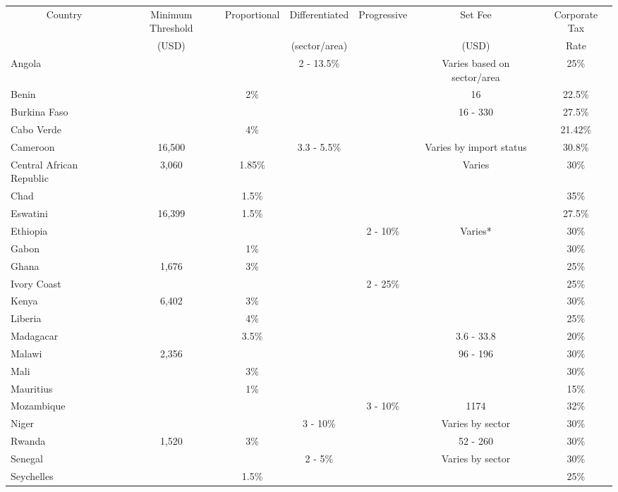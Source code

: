 \begin{tabular}{lcccccc}
\toprule
\multicolumn{1}{c}{Country} & \multicolumn{1}{c}{Minimum Threshold} & \multicolumn{1}{c}{Proportional} & \multicolumn{1}{c}{Differentiated} & \multicolumn{1}{c}{Progressive} & \multicolumn{1}{c}{Set Fee} & \multicolumn{1}{c}{Corporate Tax} \\
\multicolumn{1}{c}{} & \multicolumn{1}{c}{(USD)} & \multicolumn{1}{c}{} & \multicolumn{1}{c}{(sector/area)} & \multicolumn{1}{c}{} & \multicolumn{1}{c}{(USD)} & \multicolumn{1}{c}{Rate} \\
\midrule
Angola &  &  & 2 - 13.5\% &  & Varies based on sector/area & 25\%\\
Benin &  & 2\% &  &  & 16 & 22.5\%\\
Burkina Faso &  &  &  &  & 16 - 330 & 27.5\%\\
Cabo Verde &  & 4\% &  &  &  & 21.42\%\\
Cameroon & 16,500 &  & 3.3 - 5.5\% &  & Varies by import status & 30.8\%\\
\addlinespace
Central African Republic & 3,060 & 1.85\% &  &  & Varies & 30\%\\
Chad &  & 1.5\% &  &  &  & 35\%\\
Eswatini & 16,399 & 1.5\% &  &  &  & 27.5\%\\
Ethiopia &  &  &  & 2 - 10\% & Varies* & 30\%\\
Gabon &  & 1\% &  &  &  & 30\%\\
\addlinespace
Ghana & 1,676 & 3\% &  &  &  & 25\%\\
Ivory Coast &  &  &  & 2 - 25\% &  & 25\%\\
Kenya & 6,402 & 3\% &  &  &  & 30\%\\
Liberia &  & 4\% &  &  &  & 25\%\\
Madagacar &  & 3.5\% &  &  & 3.6 - 33.8 & 20\%\\
\addlinespace
Malawi & 2,356 &  &  &  & 96 - 196 & 30\%\\
Mali &  & 3\% &  &  &  & 30\%\\
Mauritius &  & 1\% &  &  &  & 15\%\\
Mozambique &  &  &  & 3 - 10\% & 1174 & 32\%\\
Niger &  &  & 3 - 10\% &  & Varies by sector & 30\%\\
\addlinespace
Rwanda & 1,520 & 3\% &  &  & 52 - 260 & 30\%\\
Senegal &  &  & 2 - 5\% &  & Varies by sector & 30\%\\
Seychelles &  & 1.5\% &  &  &  & 25\%\\

\end{tabular}
